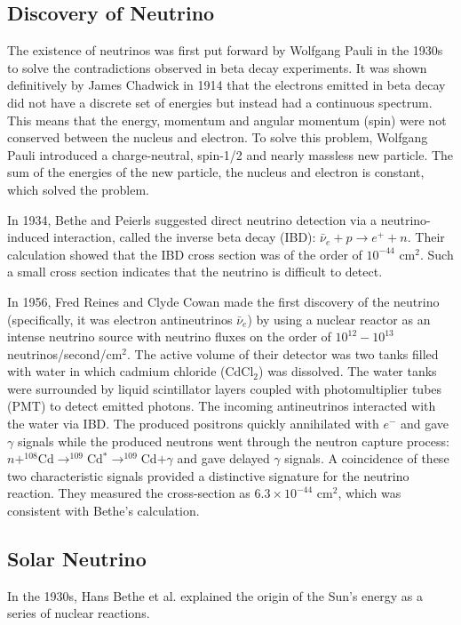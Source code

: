 
\subsection{Discovery of Neutrino}
The existence of neutrinos was first put forward by Wolfgang Pauli in the 1930s to solve the contradictions observed in beta decay experiments. It was shown definitively by James Chadwick in 1914 that the electrons emitted in beta decay did not have a discrete set of energies but instead had a continuous spectrum\cite{leite1996weak}. This means that the energy, momentum and angular momentum (spin) were not conserved between the nucleus and electron. To solve this problem, Wolfgang Pauli introduced a charge-neutral, spin-1/2 and nearly massless new particle. The sum of the energies of the new particle, the nucleus and electron is constant, which solved the problem. 

In 1934, Bethe and Peierls suggested direct neutrino detection via a neutrino-induced interaction, called the inverse beta decay (IBD): $\bar{\nu}_e+p\to e^+ + n$. Their calculation showed that the IBD cross section was of the order of $10^{-44}$ cm$^2$. Such a small cross section indicates that the neutrino is difficult to detect\cite{bethe1934neutrino}.

In 1956, Fred Reines and Clyde Cowan made the first discovery of the neutrino (specifically, it was electron antineutrinos $\bar{\nu}_e$) by using a nuclear reactor as an intense neutrino source with neutrino fluxes on the order of $10^{12}-10^{13}$ neutrinos/second/cm$^2$. The active volume of their detector was two tanks filled with water in which cadmium chloride (CdCl$_2$) was dissolved. The water tanks were surrounded by liquid scintillator layers coupled with photomultiplier tubes (PMT) to detect emitted photons. The incoming antineutrinos interacted with the water via IBD. The produced positrons quickly annihilated with $e^-$ and gave $\gamma$ signals while the produced neutrons went through the neutron capture process: $n+^{108}$Cd$\to^{109}$Cd$^*\to^{109}$Cd$+\gamma$ and gave delayed $\gamma$ signals. A coincidence of these two characteristic signals provided a distinctive signature for the neutrino reaction. They measured the cross-section as $6.3\times10^{-44}$ cm$^2$, which was consistent with Bethe's calculation\cite{reines1960detection}.

\subsection{Solar Neutrino}
In the 1930s, Hans Bethe et al. explained the origin of the Sun's energy as a series of nuclear reactions\cite{bethe1939energy}.

